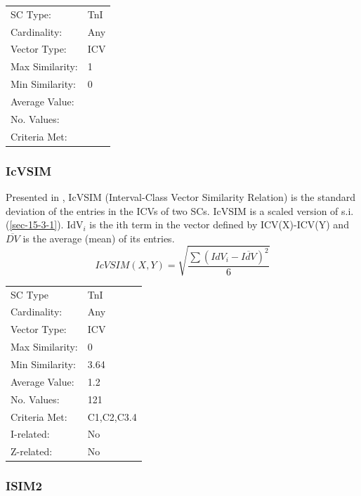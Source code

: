 \documentclass{article}
\begin{document}
\begin{center}
\begin{tabular}{ll}
 SC Type:         &  TnI  \\
 Cardinality:     &  Any  \\
 Vector Type:     &  ICV  \\
 Max Similarity:  &  1    \\
 Min Similarity:  &  0    \\
 Average Value:   &       \\
 No. Values:      &       \\
 Criteria Met:    &       \\
\end{tabular}
\end{center}
\subsubsection{IcVSIM}
\label{sec-15-6-2}

Presented in \citet[pp. 18]{Isaacson1990}, IcVSIM (Interval-Class
Vector Similarity Relation) is the standard deviation of the entries
in the ICVs of two SCs. IcVSIM is a scaled version of
s.i. (\ref{sec-15-3-1}). IdV$_{i}$ is the ith term in the vector defined by
ICV(X)-ICV(Y) and $\overline{DV}$ is the average (mean) of its
entries.
$$IcVSIM(X,Y)=\sqrt{\frac{\sum(IdV_{i}-\overline{IdV})^{2}}{6}}$$

\begin{center}
\begin{tabular}{ll}
 SC Type          &  TnI         \\
 Cardinality:     &  Any         \\
 Vector Type:     &  ICV         \\
 Max Similarity:  &  0           \\
 Min Similarity:  &  3.64        \\
 Average Value:   &  1.2         \\
 No. Values:      &  121         \\
 Criteria Met:    &  C1,C2,C3.4  \\
 I-related:       &  No          \\
 Z-related:       &  No          \\
\end{tabular}
\end{center}
\subsubsection{ISIM2}
\label{sec-15-6-3}
\end{document}
